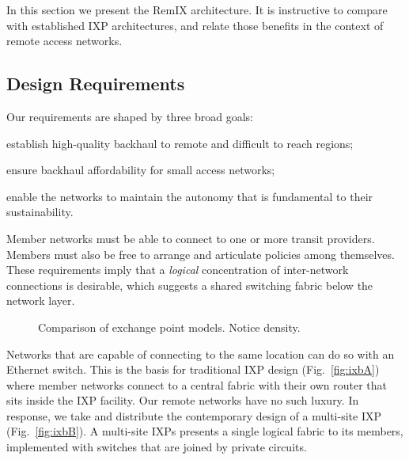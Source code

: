 In this section we present the RemIX architecture. It is instructive
to compare with established IXP architectures, and relate those
benefits in the context of remote access networks.

\subsection{Design Requirements}

Our requirements are shaped by three broad goals:
\begin{inparaenum}[(i)]
  \item establish high-quality backhaul to remote and difficult to
    reach regions;
  \item ensure backhaul affordability for small access networks;
  \item enable the networks to maintain the autonomy that is
    fundamental to their sustainability.
\end{inparaenum}
Member networks must be able to connect to one or more transit providers.
Members must also be free to arrange and articulate policies among themselves.
These requirements imply that a \emph{logical} concentration of inter-network
connections is desirable, which suggests a shared switching fabric below the
network layer.

\begin{figure*}
   \hfill
   \hfill
  \subfloat[RemIX]{
    \resizebox{0.6\columnwidth}{!}{
      \begin{tikzpicture}
        \ixboxesC
      \end{tikzpicture}
      \label{fig:ixbC}
    }
  }
  \caption{Comparison of exchange point models. Notice density.}
  \label{fig:ixb}
\end{figure*}

Networks that are capable of connecting to the same location can do so with an
Ethernet switch. This is the basis for traditional \ac{IXP} design (Fig.~\ref{fig:ixbA}) where member networks connect to a central fabric
with their own router that sits inside the IXP facility. Our remote networks
have no such luxury. In response, we take and distribute the contemporary design
of a multi-site \ac{IXP} (Fig.~\ref{fig:ixbB}). A multi-site \acp{IXP}
presents a single logical fabric to its members, implemented with switches
that are joined by private circuits.

